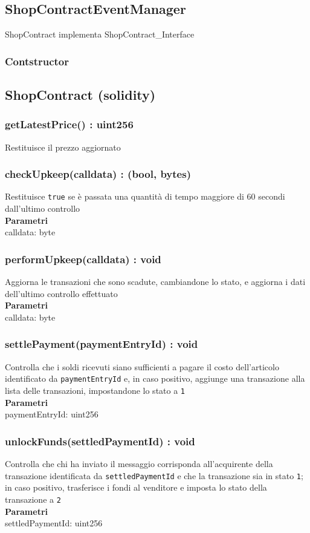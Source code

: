 \documentclass[a4paper, 12pt]{article}
\begin{document}
\subsection{ShopContractEventManager}
ShopContract implementa ShopContract\_Interface
\subsubsection{Contstructor}

\subsection{ShopContract (solidity)}
\subsubsection{getLatestPrice() : uint256}
Restituisce il prezzo aggiornato\\
\subsubsection{checkUpkeep(calldata) : (bool, bytes)}
Restituisce \texttt{true} se è passata una quantità di tempo maggiore di 60 secondi dall'ultimo controllo\\
\textbf{Parametri}\\
calldata: byte
\subsubsection{performUpkeep(calldata) : void}
Aggiorna le transazioni che sono scadute, cambiandone lo stato, e aggiorna i dati dell'ultimo controllo effettuato\\
\textbf{Parametri}\\
calldata: byte
\subsubsection{settlePayment(paymentEntryId) : void}
Controlla che i soldi ricevuti siano sufficienti a pagare il costo dell'articolo identificato da \texttt{paymentEntryId} e, in caso positivo, aggiunge una transazione alla lista delle transazioni, impostandone lo stato a \texttt{1}\\
\textbf{Parametri}\\
paymentEntryId: uint256
\subsubsection{unlockFunds(settledPaymentId) : void}
Controlla che chi ha inviato il messaggio corrisponda all'acquirente della transazione identificata da \texttt{settledPaymentId} e che la transazione sia in stato \texttt{1}; in caso positivo, trasferisce i fondi al venditore e imposta lo stato della transazione a \texttt{2}\\
\textbf{Parametri}\\
settledPaymentId: uint256
\end{document}

